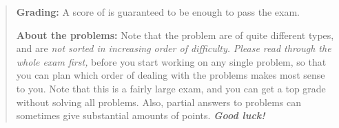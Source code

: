 \begin{abstract}
  \noindent
  \textbf{Grading:}
  A score of 
  \thresholdforpass
  is guaranteed to be enough to pass the exam.

  \noindent
  \textbf{About the problems:}
  Note that the problem are of quite different types, and are
  \emph{not sorted in increasing order of difficulty.}
  \emph{Please read through the whole exam first,} 
  before you start working on any
  single problem, so that you can plan which order of dealing with the
  problems makes most sense to you.
  Note that this is a fairly large exam, and
  you can get 
  a top grade without solving all problems.
  Also, partial answers to problems can sometimes give substantial
  amounts of points.
%   
%   
  \textbf{\emph{Good luck!}}
\end{abstract}



